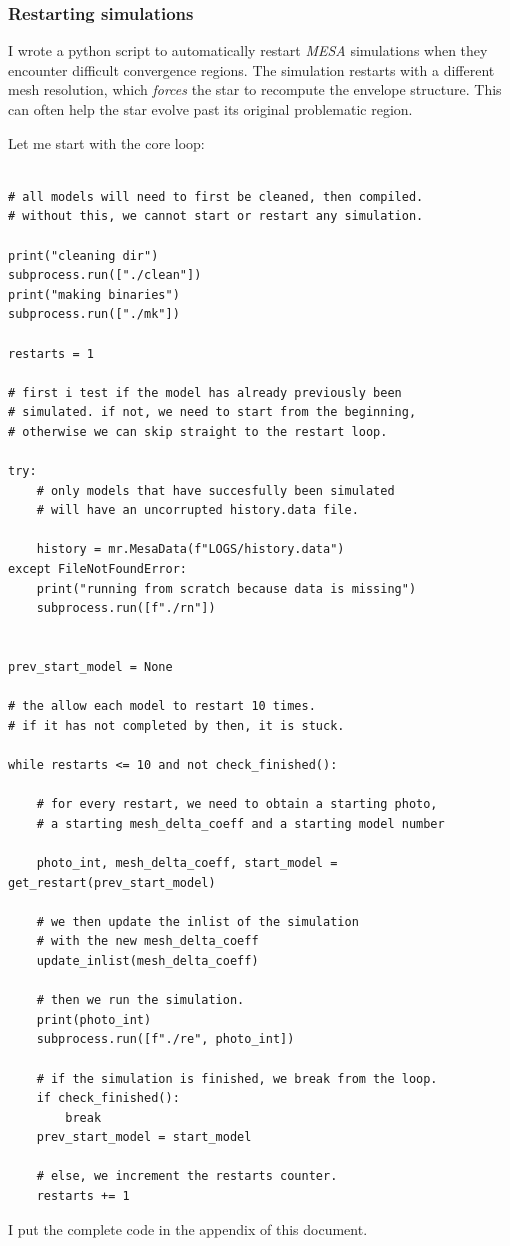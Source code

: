 \documentclass[a4paper,10pt]{article}
\begin{document}
\subsubsection{Restarting simulations}
I wrote a python script to automatically restart \emph{MESA} simulations when they encounter difficult convergence regions. The simulation restarts with a different mesh resolution, which \emph{forces} the star to recompute the envelope structure. This can often help the star evolve past its original problematic region.

Let me start with the core loop:

\begin{full}
\begin{verbatim}

# all models will need to first be cleaned, then compiled.
# without this, we cannot start or restart any simulation.

print("cleaning dir")
subprocess.run(["./clean"])
print("making binaries")
subprocess.run(["./mk"])

restarts = 1

# first i test if the model has already previously been
# simulated. if not, we need to start from the beginning,
# otherwise we can skip straight to the restart loop.

try:
    # only models that have succesfully been simulated
    # will have an uncorrupted history.data file.

    history = mr.MesaData(f"LOGS/history.data")
except FileNotFoundError:
    print("running from scratch because data is missing")
    subprocess.run([f"./rn"])


prev_start_model = None

# the allow each model to restart 10 times.
# if it has not completed by then, it is stuck.

while restarts <= 10 and not check_finished():

    # for every restart, we need to obtain a starting photo,
    # a starting mesh_delta_coeff and a starting model number

    photo_int, mesh_delta_coeff, start_model = get_restart(prev_start_model)

    # we then update the inlist of the simulation
    # with the new mesh_delta_coeff
    update_inlist(mesh_delta_coeff)

    # then we run the simulation.
    print(photo_int)
    subprocess.run([f"./re", photo_int])

    # if the simulation is finished, we break from the loop.
    if check_finished():
        break
    prev_start_model = start_model

    # else, we increment the restarts counter.
    restarts += 1
\end{verbatim}

I put the complete code in the appendix of this document.
\end{full}
\end{document}
